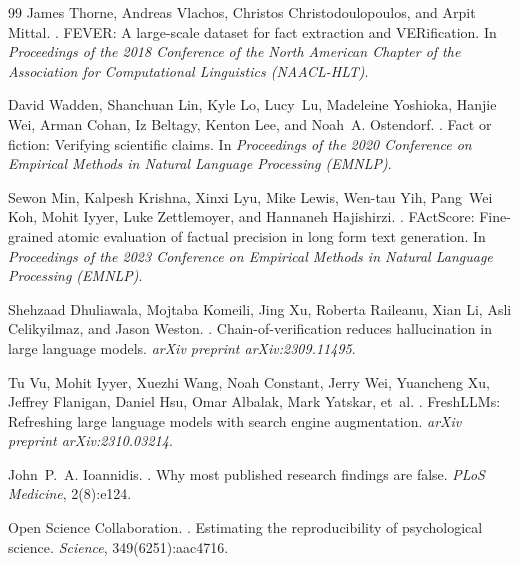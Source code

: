 \begin{thebibliography}{99}
James Thorne, Andreas Vlachos, Christos Christodoulopoulos, and Arpit
Mittal.
.
\newblock FEVER: A large-scale dataset for fact extraction and
VERification.
\newblock In \emph{Proceedings of the 2018 Conference of the North
American Chapter of the Association for Computational Linguistics
(NAACL-HLT)}.

David Wadden, Shanchuan Lin, Kyle Lo, Lucy~Lu, Madeleine Yoshioka,
Hanjie Wei, Arman Cohan, Iz Beltagy, Kenton Lee, and Noah~A. Ostendorf.
.
\newblock Fact or fiction: Verifying scientific claims.
\newblock In \emph{Proceedings of the 2020 Conference on Empirical
Methods in Natural Language Processing (EMNLP)}.

Sewon Min, Kalpesh Krishna, Xinxi Lyu, Mike Lewis, Wen-tau Yih, Pang~Wei
Koh, Mohit Iyyer, Luke Zettlemoyer, and Hannaneh Hajishirzi.
.
\newblock FActScore: Fine-grained atomic evaluation of factual precision
in long form text generation.
\newblock In \emph{Proceedings of the 2023 Conference on Empirical
Methods in Natural Language Processing (EMNLP)}.

Shehzaad Dhuliawala, Mojtaba Komeili, Jing Xu, Roberta Raileanu, Xian Li,
Asli Celikyilmaz, and Jason Weston.
.
\newblock Chain-of-verification reduces hallucination in large language
models.
\newblock \emph{arXiv preprint arXiv:2309.11495}.

Tu Vu, Mohit Iyyer, Xuezhi Wang, Noah Constant, Jerry Wei, Yuancheng Xu,
Jeffrey Flanigan, Daniel Hsu, Omar Albalak, Mark Yatskar, et~al.
.
\newblock FreshLLMs: Refreshing large language models with search engine
augmentation.
\newblock \emph{arXiv preprint arXiv:2310.03214}.

John~P.~A. Ioannidis.
.
\newblock Why most published research findings are false.
\newblock \emph{PLoS Medicine}, 2(8):e124.

Open Science Collaboration.
.
\newblock Estimating the reproducibility of psychological science.
\newblock \emph{Science}, 349(6251):aac4716.


\end{thebibliography}
